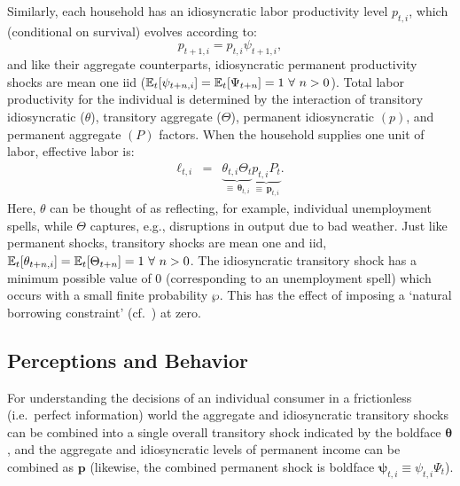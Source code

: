 \documentclass[titlepage]{./econtex}
\begin{document}
Similarly, each household has an idiosyncratic labor productivity level $p_{t,i}$, which (conditional on survival) evolves according to:
\begin{equation}
p_{t+1,i} = p_{t,i} \psi_{t+1,i},  \label{eq:IndRandWalk}
\end{equation}
and like their aggregate counterparts, idiosyncratic permanent productivity shocks are mean
one iid ($\operatorname{\mathbb{E}}_{t}[\psi_{t+n,i}]=\operatorname{\mathbb{E}}_{t}[\Psi_{t+n}]= 1~\forall ~n>0$).
Total labor productivity for the individual is determined by the interaction of transitory idiosyncratic
($\theta$), transitory aggregate ($\Theta$), permanent idiosyncratic $({p})$, and permanent aggregate
$({P})$ factors.  When the household supplies one unit of labor, effective labor is:
\begin{eqnarray}
  \label{eq:ell}
   \pmb{\ell}_{t,i} & = & \underbrace{\theta_{t,i}\Theta_{t}}_{\equiv\,\pmb{\theta}_{t,i}}\underbrace{{p}_{t,i} {P}_{t}}_{\equiv\,\pmb{p}_{t,i}}.
\end{eqnarray}
  Here, $\theta$ can be thought of as reflecting, for example, individual unemployment spells, while $\Theta$ captures, e.g., disruptions in output due to bad weather.  Just like permanent shocks, transitory shocks are mean one and iid, $\operatorname{\mathbb{E}}_{t}[\theta_{t+n,i}]=\operatorname{\mathbb{E}}_{t}[\Theta_{t+n}]=1~\forall~n>0$.  { The idiosyncratic transitory shock has a minimum possible value of 0 (corresponding to an unemployment spell) which occurs with a small finite probability $\wp$.  This has the effect of imposing a `natural borrowing constraint' (cf.\ \cite{zeldesStochastic}) at zero.}{}


\subsection{Perceptions and Behavior}

For understanding the decisions of an individual consumer in a frictionless (i.e.\ perfect information) world the aggregate and idiosyncratic transitory shocks can be combined into a single overall transitory shock indicated by the boldface $\pmb{\theta}$, and the aggregate and idiosyncratic levels of permanent income can be combined as $\pmb{p}$ (likewise, the combined permanent shock is boldface $\pmb{\psi}_{t,i}\equiv \psi_{t,i} \Psi_{t}$).
\end{document}
